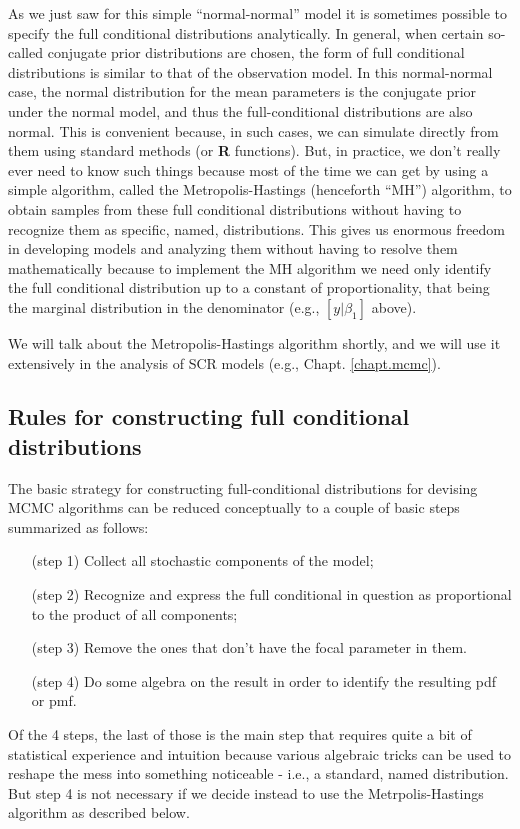 \vspace{.1in}

As we just saw for this simple ``normal-normal'' model it is sometimes
possible to specify the full conditional distributions
analytically. In general, when certain so-called conjugate prior
distributions are chosen, the form of full conditional distributions
is similar to that of the observation model. In this normal-normal
case, the normal distribution for the mean parameters is the conjugate
prior under the normal model, and thus the full-conditional
distributions are also normal. This is convenient because, in such
cases, we can simulate directly from them using standard methods (or
{\bf R}
functions).  But, in practice, we don't really ever need to know such
things because most of the time we can get by using a simple
algorithm, called the Metropolis-Hastings (henceforth ``MH'')
algorithm, to obtain samples from these full conditional distributions
without having to recognize them as specific, named, distributions.
This gives us enormous freedom in developing models
and analyzing them without having to resolve them mathematically
because to implement the MH algorithm we need only identify the full
conditional distribution up to a constant of proportionality, that
being the marginal distribution in the denominator (e.g., $[y|\beta_1]$
above).

We will talk about the Metropolis-Hastings algorithm shortly, and we
will use it extensively in the analysis of SCR models (e.g., Chapt.
\ref{chapt.mcmc}).

\subsection{Rules for constructing full conditional distributions}
\label{glms.sec.rules}

The basic strategy for constructing full-conditional distributions for
devising MCMC algorithms can be reduced conceptually to a couple of
basic steps summarized as follows:
\begin{itemize}
\item[   (step 1)] Collect all stochastic components of the model;
\item[   (step 2)] Recognize and express the full conditional in question
  as proportional to the product of all components;
\item[   (step 3)] Remove the ones that don't have the focal parameter in them.
\item[   (step 4)] Do some algebra on the result in order to identify the resulting pdf or pmf.
\end{itemize}
Of the 4 steps, the last of those is the main step that requires quite
a bit of statistical experience and intuition because various
algebraic tricks can be used to reshape the mess into something
noticeable - i.e., a standard, named distribution. But step 4 is not
necessary if we decide instead to use the Metrpolis-Hastings algorithm
as described below.

